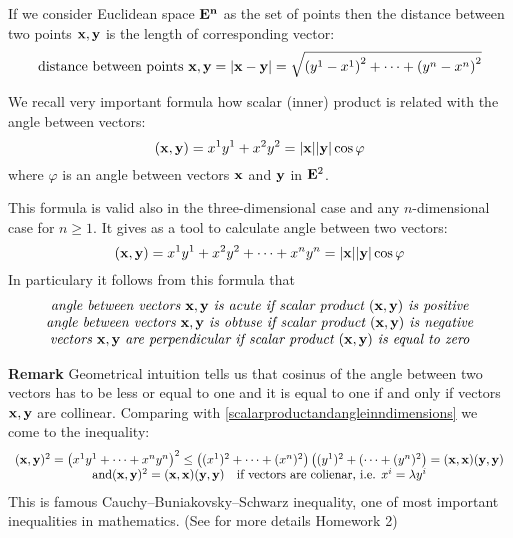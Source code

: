 \documentclass[12pt]{article}
\numberwithin{equation}{section}
\begin{document}
  If we consider Euclidean space $\bf E^n$  as the set of points then the distance between two points
  ${\bf x},{\bf y}$  is
    the length of corresponding vector:
\begin{equation*}\label{distance}
 \hbox{distance between points ${\bf x},{\bf y}$}= |{\bf x}-{\bf y}|=\sqrt {\left(y^1-x^1\right)^2
 +\dots+\left(y^{n}-x^n\right)^2}
\end{equation*}



We recall very important formula how scalar (inner) product is
related with the angle between vectors:
 \begin{equation*}\label{scalarproductandangle}
  ({\bf x},{\bf y})=x^1y^1+x^2y^2=|{\bf x}||{\bf y}|\cos\varphi
\end{equation*}
where $\varphi$ is an angle between vectors ${\bf x}$ and ${\bf y}$ in ${\bf E}^2$.

This formula is valid also in the three-dimensional case and any $n$-dimensional case for $n\geq 1$.
It gives as a tool to calculate angle between two vectors:
\begin{equation}\label{scalarproductandangleinndimensions}
  ({\bf x},{\bf y})=x^1y^1+x^2y^2+\dots+x^ny^n=|{\bf x}||{\bf y}|\cos\varphi
\end{equation}
In particulary it follows from this formula
 that
                \begin{equation}\label{angleacuteorobtuse}
                \begin {array}{cc}
 \hbox {\it angle between vectors ${\bf x},{\bf y}$ is acute  if scalar product $({\bf x},{\bf y})$ is positive}\\
\hbox {\it angle between vectors ${\bf x},{\bf y}$ is obtuse  if scalar product $({\bf x},{\bf y})$ is negative}\\
\hbox {\it vectors ${\bf x},{\bf y}$ are perpendicular  if scalar product $({\bf x},{\bf y})$ is equal to zero}
          \end{array}
          \end{equation}



{\footnotesize {\bf Remark} Geometrical intuition  tells us that cosinus of the angle between two vectors has to be
 less or equal to one and it is equal to one if and only if vectors ${\bf x},{\bf y}$ are collinear.
 Comparing with \eqref{scalarproductandangleinndimensions} we come to the inequality:
                  \begin{equation}\label{cauchybuniakovsky}
                  \begin{array}{cc}
            ({\bf x},{\bf y})^2=\left(x^1y^1+\dots+x^ny^n\right)^2\leq \left((x^1)^2+\dots+(x^n)^2\right)
             \left((y^1)^2+(\dots+(y^n)^2\right)=({\bf x},{\bf x})({\bf y},{\bf y})\\
           {\rm and} ({\bf x},{\bf y})^2=({\bf x},{\bf x})({\bf y},{\bf y})\quad \hbox {if vectors are colienar, i.e. $x^i=\lambda y^i$}
             \end{array}
                  \end{equation}
This is famous Cauchy--Buniakovsky--Schwarz inequality, one of most
important inequalities in mathematics. (See for more details
Homework 2)}
\end{document}
